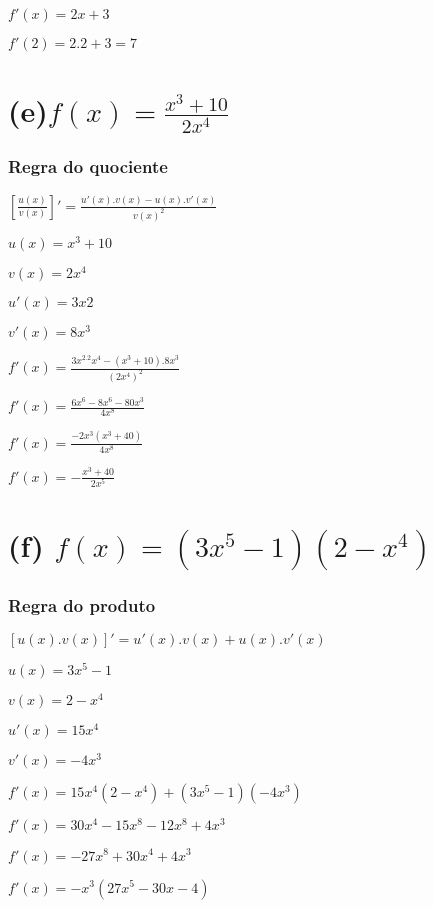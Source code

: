 \(f'(x)=2x+3\)

\(f'(2)=2.2+3=7\)

\hypertarget{efxfracx3102x4}{%
\section{\texorpdfstring{(e)\(f(x)=\frac{x^3+10}{2x^4}\)}{(e)f(x)=\textbackslash{}frac\{x\^{}3+10\}\{2x\^{}4\}}}\label{efxfracx3102x4}}

\hypertarget{regra-do-quociente}{%
\subsubsection{Regra do quociente}\label{regra-do-quociente}}

\([\frac{u(x)}{v(x)}]'=\frac{u'(x).v(x)-u(x).v'(x)}{v(x)^2}\)

\(u(x)=x^3+10\)

\(v(x)=2x^4\)

\(u'(x) = 3x2\)

\(v'(x) = 8x^3\)

\(f'(x)=\frac{3x^2.2x^4-(x^3+10).8x^3}{(2x^4)^2}\)

\(f'(x) = \frac{6x^6-8x^6-80x^3}{4x^8}\)

\(f'(x)=\frac{-2x^3(x^3+40)}{4x^8}\)

\(f'(x)=-\frac{x^3+40}{2x^5}\)

\hypertarget{f-fx3x5-12-x4}{%
\section{\texorpdfstring{(f)
\(f(x)=(3x^5-1)(2-x^4)\)}{(f) f(x)=(3x\^{}5-1)(2-x\^{}4)}}\label{f-fx3x5-12-x4}}

\hypertarget{regra-do-produto}{%
\subsubsection{Regra do produto}\label{regra-do-produto}}

\([u(x).v(x)]'=u'(x).v(x)+u(x).v'(x)\)

\(u(x)=3x^5-1\)

\(v(x)=2-x^4\)

\(u'(x)=15x^4\)

\(v'(x)=-4x^3\)

\(f'(x)=15x^4(2-x^4)+(3x^5-1)(-4x^3)\)

\(f'(x)=30x^4-15x^8-12x^8+4x^3\)

\(f'(x)=-27x^8+30x^4+4x^3\)

\(f'(x)=-x^3(27x^5-30x-4)\)

